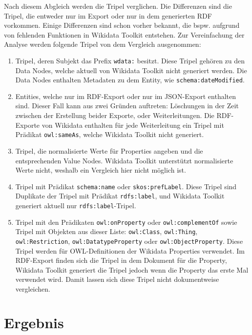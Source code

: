 Nach diesem Abgleich werden die Tripel verglichen.
Die Differenzen sind die Tripel, die entweder nur im Export oder nur in dem generierten RDF vorkommen.
Einige Differenzen sind schon vorher bekannt, die bspw. aufgrund von fehlenden Funktionen in Wikidata Toolkit entstehen.
Zur Vereinfachung der Analyse werden folgende Tripel von dem Vergleich ausgenommen:
\begin{enumerate}
\item Tripel, deren Subjekt das Prefix \verb|wdata:| besitzt. Diese Tripel gehören zu den Data Nodes, welche aktuell von Wikidata Toolkit nicht generiert werden.
Die Data Nodes enthalten Metadaten zu dem Entity, wie \verb|schema:dateModified|.
\item Entities, welche nur im RDF-Export oder nur im JSON-Export enthalten sind. Dieser Fall kann aus zwei Gründen auftreten: Löschungen in der Zeit zwischen der Erstellung beider Exporte, oder Weiterleitungen.
  Die RDF-Exporte von Wikidata enthalten für jede Weiterleitung ein Tripel mit Prädikat \verb|owl:sameAs|, welche Wikidata Toolkit nicht generiert.
\item Tripel, die normalisierte Werte für Properties angeben und die entsprechenden Value Nodes. Wikidata Toolkit unterstützt normalisierte Werte nicht, weshalb ein Vergleich hier nicht möglich ist.
\item Tripel mit Prädikat \verb|schema:name| oder \verb|skos:prefLabel|. Diese Tripel sind Duplikate der Tripel mit Prädikat \verb|rdfs:label|, und Wikidata Toolkit generiert aktuell nur \verb|rdfs:label|-Tripel.
\item Tripel mit den Prädikaten \verb|owl:onProperty| oder \verb|owl:complementOf| sowie Tripel mit Objekten aus dieser Liste: \verb|owl:Class|, \verb|owl:Thing|, \verb|owl:Restriction|, \verb|owl:DatatypeProperty| oder \verb|owl:ObjectProperty|. Diese Tripel werden für OWL-Definitionen der Wikidata Properties verwendet.
Im RDF-Export finden sich die Tripel in dem Dokument für die Property, Wikidata Toolkit generiert die Tripel jedoch wenn die Property das erste Mal verwendet wird. Damit lassen sich diese Tripel nicht dokumentweise vergleichen.
\end{enumerate}

\section{Ergebnis} 


